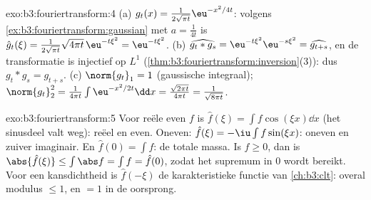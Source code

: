 \begin{solution}{exo:b3:fouriertransform:4}
(a) $g_t(x) = \frac1{2\sqrt{\pi t}}\eu^{-x^2/4t}$: volgens
\cref{ex:b3:fouriertransform:gaussian} met $a = \frac1{4t}$ is
$\hat g_t(\xi) = \frac1{2\sqrt{\pi t}}\sqrt{4\pi
t}\,\eu^{-t\xi^2} = \eu^{-t\xi^2}$.
(b) $\widehat{g_t * g_s} = \eu^{-t\xi^2}\eu^{-s\xi^2} =
\widehat{g_{t+s}}$, en de transformatie is injectief op $L^1$
(\cref{thm:b3:fouriertransform:inversion}(3)): dus $g_t * g_s =
g_{t+s}$.
(c) $\norm{g_t}_1 = 1$ (gaussische integraal);
$\norm{g_t}_2^2 = \frac1{4\pi t}\int\eu^{-x^2/2t}\dd x =
\frac{\sqrt{2\pi t}}{4\pi t} = \frac1{\sqrt{8\pi t}}$.
\end{solution}

\begin{solution}{exo:b3:fouriertransform:5}
Voor reële even $f$ is $\hat f(\xi) = \int f\cos(\xi x)\dd x$
(het sinusdeel valt weg): reëel en even. Oneven: $\hat f(\xi) =
-\iu\int f\sin(\xi x)$: oneven en zuiver imaginair. En $\hat f(0)
= \int f$: de totale massa. Is $f \geq 0$, dan is $\abs{\hat
f(\xi)} \leq \int\abs f = \int f = \hat f(0)$, zodat het supremum
in $0$ wordt bereikt. Voor een kansdichtheid is $\hat f(-\xi)$ de
karakteristieke functie van \cref{ch:b3:clt}: overal modulus
$\leq 1$, en $= 1$ in de oorsprong.
\end{solution}

